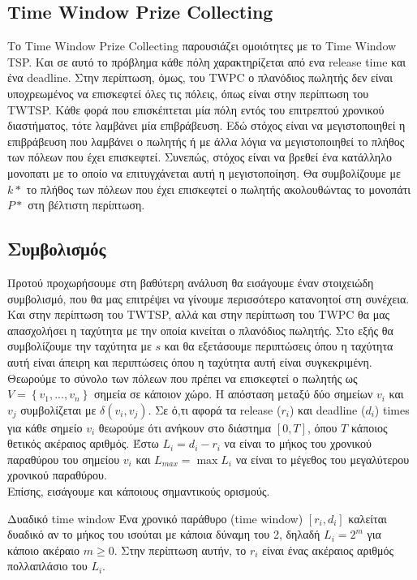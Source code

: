 \documentclass[oneside,12pt]{book}
\theoremstyle{definition}
\begin{document}
\subsection{Time Window Prize Collecting}

Το Time Window Prize Collecting παρουσιάζει ομοιότητες με το Time Window TSP. Και σε αυτό το πρόβλημα κάθε πόλη χαρακτηρίζεται από ενα release time και ένα deadline. Στην περίπτωση, όμως, του TWPC ο πλανόδιος πωλητής δεν είναι υποχρεωμένος να επισκεφτεί όλες τις πόλεις, όπως είναι στην περίπτωση του TWTSP. Κάθε φορά που επισκέπτεται μία πόλη εντός του επιτρεπτού χρονικού διαστήματος, τότε λαμβάνει μία επιβράβευση. Εδώ στόχος είναι να μεγιστοποιηθεί η επιβράβευση που λαμβάνει ο πωλητής ή με άλλα λόγια να μεγιστοποιηθεί το πλήθος των πόλεων που έχει επισκεφτεί. Συνεπώς, στόχος είναι να βρεθεί ένα κατάλληλο μονοπατι με το οποίο να επιτυγχάνεται αυτή η μεγιστοποίηση. Θα συμβολίζουμε με \(k*\) το πλήθος των πόλεων που έχει επισκεφτεί ο πωλητής ακολουθώντας το μονοπάτι \(P*\) στη βέλτιστη περίπτωση. \\  

\subsection{Συμβολισμός}

Προτού προχωρήσουμε στη βαθύτερη ανάλυση θα εισάγουμε έναν στοιχειώδη συμβολισμό, που θα μας επιτρέψει να γίνουμε περισσότερο κατανοητοί στη συνέχεια. Και στην περίπτωση του TWTSP, αλλά και στην περίπτωση του TWPC θα μας απασχολήσει η ταχύτητα με την οποία κινείται ο πλανόδιος πωλητής. Στο εξής θα συμβολίζουμε την ταχύτητα με \(s\) και θα εξετάσουμε περιπτώσεις όπου η ταχύτητα αυτή είναι άπειρη και περιπτώσεις όπου η ταχύτητα αυτή είναι συγκεκριμένη. Θεωρούμε το σύνολο των πόλεων που πρέπει να επισκεφτεί ο πωλητής ως \(V = \left\{v_1, ..., v_n\right\}\) σημεία σε κάποιον χώρο. Η απόσταση μεταξύ δύο σημείων \(v_i\) και \(v_j\) συμβολίζεται με \(δ(v_i, v_j)\). Σε ό,τι αφορά τα release (\(r_i\)) και deadline (\(d_i\)) times για κάθε σημείο \(v_i\) θεωρούμε ότι ανήκουν στο διάστημα \([0,Τ]\), όπου \(Τ\) κάποιος θετικός ακέραιος αριθμός. Έστω \(L_i = d_i - r_i\) να είναι το μήκος του χρονικού παραθύρου του σημείου \(v_i\) και \(L_{max} = \max L_i\) να είναι το μέγεθος του μεγαλύτερου χρονικού παραθύρου. \\

Επίσης, εισάγουμε και κάποιους σημαντικούς ορισμούς. \\

\begin{mydefinition}{Δυαδικό time window}{}
	Ένα χρονικό παράθυρο (time window) \([r_i, d_i]\) καλείται δυαδικό αν το μήκος του ισούται με κάποια δύναμη του 2, δηλαδή \(L_i = 2^m\) για κάποιο ακέραιο \(m \geq 0\). Στην περίπτωση αυτήν, το \(r_i\) είναι ένας ακέραιος αριθμός πολλαπλάσιο του \(L_i\). 
\end{mydefinition}
\end{document}
